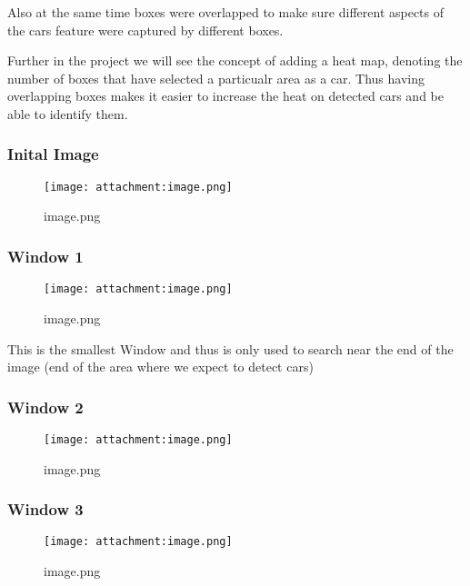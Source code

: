 \documentclass[11pt]{article}
\makeatletter
\def\maxwidth{\ifdim\Gin@nat@width>\linewidth\linewidth
    \else\Gin@nat@width\fi}
\let\Oldincludegraphics\includegraphics
\renewcommand{\includegraphics}[1]{\Oldincludegraphics[width=.8\maxwidth]{#1}}
\makeatother
\begin{document}
Also at the same time boxes were overlapped to make sure different
aspects of the cars feature were captured by different boxes.

Further in the project we will see the concept of adding a heat map,
denoting the number of boxes that have selected a particualr area as a
car. Thus having overlapping boxes makes it easier to increase the heat
on detected cars and be able to identify them.

\hypertarget{inital-image}{%
\subsubsection{Inital Image}\label{inital-image}}

\begin{figure}
\centering
\texttt{[image: attachment:image.png]}
\caption{image.png}
\end{figure}

    \hypertarget{window-1}{%
\subsubsection{Window 1}\label{window-1}}

\begin{figure}
\centering
\texttt{[image: attachment:image.png]}
\caption{image.png}
\end{figure}

This is the smallest Window and thus is only used to search near the end
of the image (end of the area where we expect to detect cars)

    \hypertarget{window-2}{%
\subsubsection{Window 2}\label{window-2}}

\begin{figure}
\centering
\texttt{[image: attachment:image.png]}
\caption{image.png}
\end{figure}

    \hypertarget{window-3}{%
\subsubsection{Window 3}\label{window-3}}

\begin{figure}
\centering
\texttt{[image: attachment:image.png]}
\caption{image.png}
\end{figure}
\end{document}
